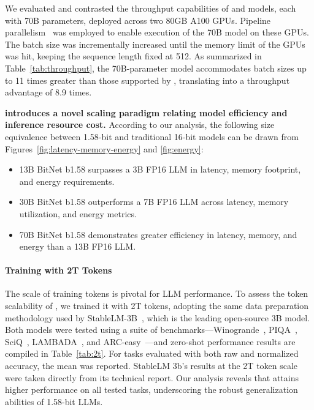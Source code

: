 We evaluated and contrasted the throughput capabilities of  and  models, each with 70B parameters, deployed across two 80GB A100 GPUs. Pipeline parallelism~\cite{gpipe} was employed to enable execution of the  70B model on these GPUs. The batch size was incrementally increased until the memory limit of the GPUs was hit, keeping the sequence length fixed at 512. As summarized in Table~\ref{tab:throughput}, the 70B-parameter  model accommodates batch sizes up to 11 times greater than those supported by , translating into a throughput advantage of 8.9 times.

\textbf{ introduces a novel scaling paradigm relating model efficiency and inference resource cost.} According to our analysis, the following size equivalence between 1.58-bit and traditional 16-bit models can be drawn from Figures~\ref{fig:latency-memory-energy} and \ref{fig:energy}:

\begin{itemize}
    \item 13B BitNet b1.58 surpasses a 3B FP16 LLM in latency, memory footprint, and energy requirements.
    \item 30B BitNet b1.58 outperforms a 7B FP16 LLM across latency, memory utilization, and energy metrics.
    \item 70B BitNet b1.58 demonstrates greater efficiency in latency, memory, and energy than a 13B FP16 LLM.
\end{itemize}

\paragraph{Training with 2T Tokens}

The scale of training tokens is pivotal for LLM performance. To assess the token scalability of , we trained it with 2T tokens, adopting the same data preparation methodology used by StableLM-3B~\cite{StableLM-3B-4E1T}, which is the leading open-source 3B model. Both models were tested using a suite of benchmarks—Winogrande~\cite{winoGrande}, PIQA~\cite{piqa}, SciQ~\cite{sciq}, LAMBADA~\cite{lambada}, and ARC-easy~\cite{arc}—and zero-shot performance results are compiled in Table~\ref{tab:2t}. For tasks evaluated with both raw and normalized accuracy, the mean was reported. StableLM 3b's results at the 2T token scale were taken directly from its technical report. Our analysis reveals that  attains higher performance on all tested tasks, underscoring the robust generalization abilities of 1.58-bit LLMs.

